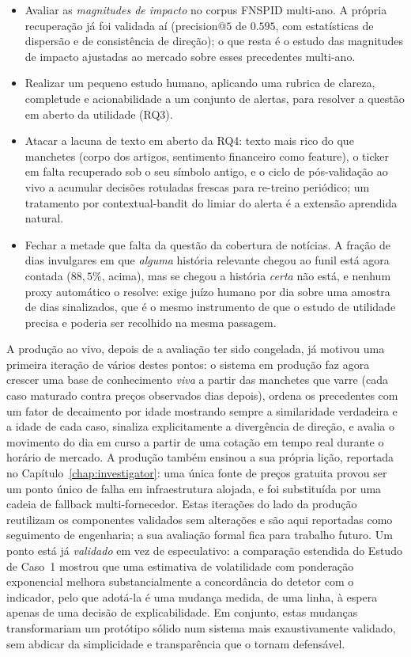 \begin{itemize}
  \item Avaliar as \emph{magnitudes de impacto} no corpus FNSPID multi-ano. A própria recuperação já
        foi validada aí (precision@$5$ de $0.595$, com estatísticas de dispersão e de consistência de
        direção); o que resta é o estudo das magnitudes de impacto ajustadas ao mercado sobre esses
        precedentes multi-ano.
  \item Realizar um pequeno estudo humano, aplicando uma rubrica de clareza, completude e
        acionabilidade a um conjunto de alertas, para resolver a questão em aberto da utilidade (RQ3).
  \item Atacar a lacuna de texto em aberto da RQ4: texto mais rico do que manchetes (corpo dos
        artigos, sentimento financeiro como feature), o ticker em falta recuperado sob o seu símbolo
        antigo, e o ciclo de pós-validação ao vivo a acumular decisões rotuladas frescas para
        re-treino periódico; um tratamento por contextual-bandit do limiar do alerta é a extensão
        aprendida natural.
  \item Fechar a metade que falta da questão da cobertura de notícias. A fração de dias invulgares
        em que \emph{alguma} história relevante chegou ao funil está agora contada ($88,5\%$, acima),
        mas se chegou a história \emph{certa} não está, e nenhum proxy automático o resolve: exige
        juízo humano por dia sobre uma amostra de dias sinalizados, que é o mesmo instrumento de que
        o estudo de utilidade precisa e poderia ser recolhido na mesma passagem.
\end{itemize}
A produção ao vivo, depois de a avaliação ter sido congelada, já motivou uma primeira iteração de
vários destes pontos: o sistema em produção faz agora crescer uma base de conhecimento \emph{viva} a
partir das manchetes que varre (cada caso maturado contra preços observados dias depois), ordena os
precedentes com um fator de decaimento por idade mostrando sempre a similaridade verdadeira e a idade
de cada caso, sinaliza explicitamente a divergência de direção, e avalia o movimento do dia em curso a
partir de uma cotação em tempo real durante o horário de mercado. A produção também ensinou a sua
própria lição, reportada no Capítulo~\ref{chap:investigator}: uma única fonte de preços gratuita
provou ser um ponto único de falha em infraestrutura alojada, e foi substituída por uma cadeia de
fallback multi-fornecedor. Estas iterações do lado da produção reutilizam os componentes validados sem
alterações e são aqui reportadas como seguimento de engenharia; a sua avaliação formal fica para
trabalho futuro. Um ponto está já \emph{validado} em vez de especulativo: a comparação estendida do
Estudo de Caso~1 mostrou que uma estimativa de volatilidade com ponderação exponencial melhora
substancialmente a concordância do detetor com o indicador, pelo que adotá-la é uma mudança medida, de
uma linha, à espera apenas de uma decisão de explicabilidade. Em conjunto, estas mudanças transformariam
um protótipo sólido num sistema mais exaustivamente validado, sem abdicar da simplicidade e
transparência que o tornam defensável.
